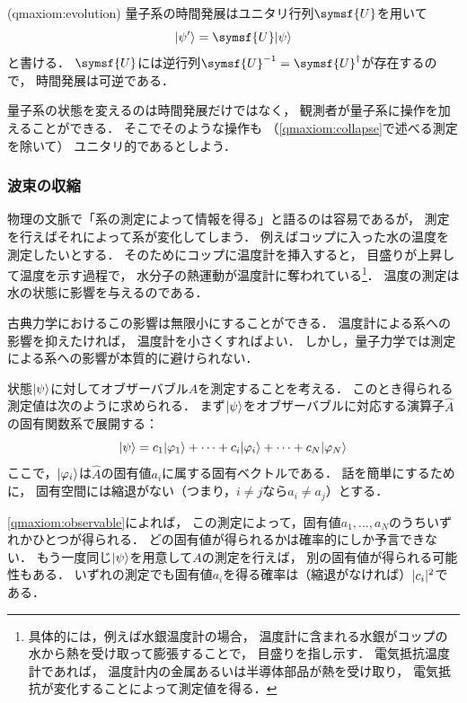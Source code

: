 \documentclass[
]{sotsu}
\begin{document}
\begin{qmaxiom}[状態の時間発展](qmaxiom:evolution)
    量子系の時間発展はユニタリ行列$\symsf{U}$を用いて
    \begin{equation}
        \ket{\psi'} = \symsf{U} \ket{\psi}
    \end{equation}
    と書ける．
    $\symsf{U}$には逆行列$\symsf{U}^{-1} = \adjoint{\symsf{U}}$が存在するので，
    時間発展は可逆である．
\end{qmaxiom}

量子系の状態を変えるのは時間発展だけではなく，
観測者が量子系に操作を加えることができる．
そこでそのような操作も
（\cref{qmaxiom:collapse}で述べる測定を除いて）
ユニタリ的であるとしよう．




\subsubsection{波束の収縮}

物理の文脈で「系の測定によって情報を得る」と語るのは容易であるが，
測定を行えばそれによって系が変化してしまう．
例えばコップに入った水の温度を測定したいとする．
そのためにコップに温度計を挿入すると，
目盛りが上昇して温度を示す過程で，
水分子の熱運動が温度計に奪われている\footnote{
    具体的には，例えば水銀温度計の場合，
    温度計に含まれる水銀がコップの水から熱を受け取って膨張することで，
    目盛りを指し示す．
    電気抵抗温度計であれば，
    温度計内の金属あるいは半導体部品が熱を受け取り，
    電気抵抗が変化することによって測定値を得る．
}．
温度の測定は水の状態に影響を与えるのである．

古典力学におけるこの影響は無限小にすることができる．
温度計による系への影響を抑えたければ，
温度計を小さくすればよい．
しかし，量子力学では測定による系への影響が本質的に避けられない．

状態$\ket{\psi}$に対してオブザーバブル$A$を測定することを考える．
このとき得られる測定値は次のように求められる．
まず$\ket{\psi}$をオブザーバブルに対応する演算子$\hat{A}$の固有関数系で展開する：
\begin{equation*}
    \ket{\psi} = c_1 \ket{\varphi_1} + \dots + c_i \ket{\varphi_i} + \dots + c_N \ket{\varphi_N}
\end{equation*}
ここで，$\ket{\varphi_i}$は$\hat{A}$の固有値$a_i$に属する固有ベクトルである．
話を簡単にするために，
固有空間には縮退がない（つまり，$i \neq j$なら$a_i \neq a_j$）とする．

\cref{qmaxiom:observable}によれば，
この測定によって，固有値$a_1, \dots, a_N$のうちいずれかひとつが得られる．
どの固有値が得られるかは確率的にしか予言できない．
もう一度同じ$\ket{\psi}$を用意して$A$の測定を行えば，
別の固有値が得られる可能性もある．
いずれの測定でも固有値$a_i$を得る確率は（縮退がなければ）$\lvert c_i\rvert^2$である．
\end{document}
